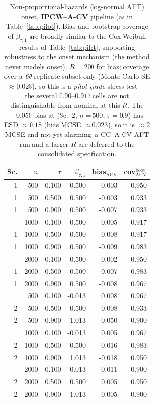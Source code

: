 \begin{table}[t]\centering\small
\caption{Non-proportional-hazards (log-normal AFT) onset, \textbf{IPCW--A-CV} pipeline (as in Table~\ref{tab:pilot}). Bias and bootstrap coverage of $\beta_{\tau,1}$ are broadly similar to the Cox-Weibull results of Table~\ref{tab:pilot}, supporting robustness to the onset mechanism (the method never models onset). $R=200$ for bias; coverage over a \emph{60}-replicate subset only (Monte-Carlo SE $\approx0.028$), so this is a \emph{pilot-grade} stress test --- the several $0.90$--$0.917$ cells are not distinguishable from nominal at this $R$. The $-0.050$ bias at (Sc.\ 2, $n{=}500$, $\tau{=}0.9$) has ESD $\approx0.18$ (bias MCSE $\approx0.023$), so it is $\approx2$ MCSE and not yet alarming; a CC--A-CV AFT run and a larger $R$ are deferred to the consolidated specification.}
\label{tab:nonph}\begin{tabular}{rrr r rr}\toprule
Sc.&$n$&$\tau$&$\beta_{\tau,1}$&bias$_{\text{ACV}}$&cov$_{\text{ACV}}^{\text{boot}}$\\\midrule
1 & 500 & 0.100 & 0.500 & 0.003 & 0.950
\\
1 & 500 & 0.500 & 0.500 & -0.003 & 0.933
\\
1 & 500 & 0.900 & 0.500 & -0.007 & 0.933
\\
\addlinespace
1 & 1000 & 0.100 & 0.500 & -0.005 & 0.917
\\
1 & 1000 & 0.500 & 0.500 & 0.008 & 0.917
\\
1 & 1000 & 0.900 & 0.500 & -0.009 & 0.983
\\
\addlinespace
1 & 2000 & 0.100 & 0.500 & 0.002 & 0.950
\\
1 & 2000 & 0.500 & 0.500 & -0.007 & 0.983
\\
1 & 2000 & 0.900 & 0.500 & -0.008 & 0.967
\\
\addlinespace
2 & 500 & 0.100 & -0.013 & 0.008 & 0.967
\\
2 & 500 & 0.500 & 0.500 & 0.008 & 0.933
\\
2 & 500 & 0.900 & 1.013 & -0.050 & 0.900
\\
\addlinespace
2 & 1000 & 0.100 & -0.013 & 0.005 & 0.967
\\
2 & 1000 & 0.500 & 0.500 & -0.016 & 0.983
\\
2 & 1000 & 0.900 & 1.013 & -0.018 & 0.950
\\
\addlinespace
2 & 2000 & 0.100 & -0.013 & 0.011 & 0.900
\\
2 & 2000 & 0.500 & 0.500 & 0.005 & 0.950
\\
2 & 2000 & 0.900 & 1.013 & -0.005 & 0.900
\\
\bottomrule\end{tabular}\end{table}

